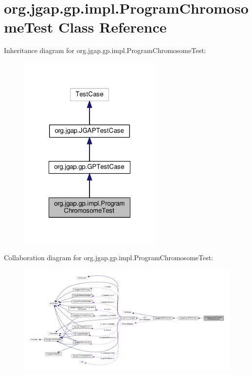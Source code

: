 \hypertarget{classorg_1_1jgap_1_1gp_1_1impl_1_1_program_chromosome_test}{\section{org.\-jgap.\-gp.\-impl.\-Program\-Chromosome\-Test Class Reference}
\label{classorg_1_1jgap_1_1gp_1_1impl_1_1_program_chromosome_test}
}


Inheritance diagram for org.\-jgap.\-gp.\-impl.\-Program\-Chromosome\-Test\-:
\nopagebreak
\begin{figure}[H]
\begin{center}
\leavevmode
\includegraphics[width=204pt]{classorg_1_1jgap_1_1gp_1_1impl_1_1_program_chromosome_test__inherit__graph}
\end{center}
\end{figure}


Collaboration diagram for org.\-jgap.\-gp.\-impl.\-Program\-Chromosome\-Test\-:
\nopagebreak
\begin{figure}[H]
\begin{center}
\leavevmode
\includegraphics[width=350pt]{classorg_1_1jgap_1_1gp_1_1impl_1_1_program_chromosome_test__coll__graph}
\end{center}
\end{figure}
